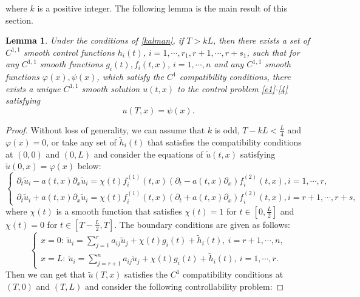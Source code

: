 \documentclass[a4paper,reqno,11pt]{amsart}
\numberwithin{equation}{section} %
\newtheorem{lem}{Lemma}[section]
\begin{document}
where $k$ is a positive integer. The following lemma is the main result of this section.
\begin{lem}\label{lem:linear}
Under the conditions of \eqref{kalman}, if $T>kL$, then there exists a set of $C^{1,1}$ smooth control functions $h_i(t)$, $i=1,\cdots ,r_1, r+1,\cdots ,r+s_1$, such that for any $C^{1,1}$ smooth functions $g_i(t), f_i(t,x)$, $i=1,\cdots ,n$ and any $C^{1,1}$ smooth functions $\varphi (x), \psi (x)$, which satisfy the $C^1$ compatibility conditions, there exists a unique $C^{1,1}$ smooth solution $u(t,x)$ to the control problem \eqref{e1}-\eqref{4} satisfying
	\begin{equation}\label{5}
        u(T,x)=\psi(x).
    \end{equation}
\end{lem}
\begin{proof}
	Without loss of generality, we can assume that $k$ is odd, $T-kL < \frac{L}{4}$ and $\varphi (x)=0$, or take any set of $\tilde{h}_i(t)$ that satisfies the compatibility conditions at $(0,0)$ and $(0,L)$ and consider the equations of $\tilde{u}(t,x)$ satisfying $\tilde{u}(0,x)= \varphi(x)$ below:
	\begin{equation}\label{e4}
		\left\{\begin{array}{l}
		\partial_t \tilde{u} _i- a(t,x)\partial_x \tilde{u} _i=\chi (t)f^{(1)}_i(t,x)(\partial_t - a(t,x)\partial_x)f^{(2)}_i(t,x), i=1, \cdots, r, \\
		\partial_t \tilde{u} _i+ a(t,x)\partial_x \tilde{u} _i=\chi (t)f^{(1)}_i(t,x)(\partial_t + a(t,x)\partial_x)f^{(2)}_i(t,x), i=r+1, \cdots, r+s,
		\end{array}\right.
	\end{equation}
where $\chi (t)$ is a smooth function that satisfies $\chi (t)=1$ for $t\in [0,\frac{L}{2}]$ and $\chi (t)=0$ for $t\in [T-\frac{L}{2},T]$. The boundary conditions are given as follows:
\begin{equation}\label{e5}
		\left\{ \begin{array}{l}
		x=0:\ \tilde{u} _i=\sum_{j=1}^r{a_{ij}\tilde{u} _j + \chi (t)g_i(t) + \tilde{h} _i\left( t \right) ,\ i=r+1,\cdots ,n,}\\
		x=L:\ \tilde{u} _i=\sum_{j=r+1}^n{a_{ij}\tilde{u} _j +\chi (t)g_i(t) + \tilde{h} _i\left( t \right) ,\ i=1,\cdots ,r.}
		\end{array} \right. 
	\end{equation}
Then we can get that $\tilde{u}(T,x)$ satisfies the $C^1$ compatibility conditions at $(T,0)$ and $(T,L)$ and consider the following controllability problem:

\end{proof}
\end{document}
